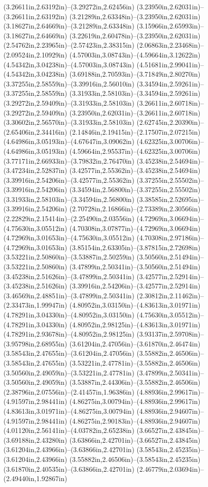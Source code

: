 (3.26611in,2.63192in)--(3.29272in,2.62456in) (3.23950in,2.62031in)--(3.26611in,2.63192in) (3.21289in,2.63348in)--(3.23950in,2.62031in) (3.18627in,2.64669in)--(3.21289in,2.63348in) (3.15966in,2.65993in)--(3.18627in,2.64669in) (3.22619in,2.60478in)--(3.23950in,2.62031in) (2.54762in,2.23965in)--(2.57423in,2.38315in) (2.06863in,2.23468in)--(2.09524in,2.10929in) (4.57003in,3.08743in)--(4.59664in,3.12622in) (4.54342in,3.04238in)--(4.57003in,3.08743in) (4.51681in,2.99041in)--(4.54342in,3.04238in) (3.69188in,2.70593in)--(3.71849in,2.80270in) (3.37255in,2.58559in)--(3.39916in,2.56010in) (3.34594in,2.59261in)--(3.37255in,2.58559in) (3.31933in,2.58103in)--(3.34594in,2.59261in) (3.29272in,2.59409in)--(3.31933in,2.58103in) (3.26611in,2.60718in)--(3.29272in,2.59409in) (3.23950in,2.62031in)--(3.26611in,2.60718in) (3.30602in,2.56570in)--(3.31933in,2.58103in) (2.62745in,2.20390in)--(2.65406in,2.34416in) (2.14846in,2.19415in)--(2.17507in,2.07215in) (4.64986in,3.05193in)--(4.67647in,3.09062in) (4.62325in,3.00706in)--(4.64986in,3.05193in) (4.59664in,2.95537in)--(4.62325in,3.00706in) (3.77171in,2.66933in)--(3.79832in,2.76470in) (3.45238in,2.54694in)--(3.47234in,2.52837in) (3.42577in,2.55362in)--(3.45238in,2.54694in) (3.39916in,2.54206in)--(3.42577in,2.55362in) (3.37255in,2.55502in)--(3.39916in,2.54206in) (3.34594in,2.56800in)--(3.37255in,2.55502in) (3.31933in,2.58103in)--(3.34594in,2.56800in) (3.38585in,2.52695in)--(3.39916in,2.54206in) (2.70728in,2.16866in)--(2.73389in,2.30566in) (2.22829in,2.15414in)--(2.25490in,2.03556in) (4.72969in,3.06694in)--(4.75630in,3.05512in) (4.70308in,3.07877in)--(4.72969in,3.06694in) (4.72969in,3.01653in)--(4.75630in,3.05512in) (4.70308in,2.97186in)--(4.72969in,3.01653in) (3.85154in,2.63305in)--(3.87815in,2.72698in) (3.53221in,2.50860in)--(3.53887in,2.50259in) (3.50560in,2.51494in)--(3.53221in,2.50860in) (3.47899in,2.50341in)--(3.50560in,2.51494in) (3.45238in,2.51626in)--(3.47899in,2.50341in) (3.42577in,2.52914in)--(3.45238in,2.51626in) (3.39916in,2.54206in)--(3.42577in,2.52914in) (3.46569in,2.48851in)--(3.47899in,2.50341in) (2.30812in,2.11462in)--(2.33473in,1.99947in) (4.80952in,3.03150in)--(4.83613in,3.01971in) (4.78291in,3.04330in)--(4.80952in,3.03150in) (4.75630in,3.05512in)--(4.78291in,3.04330in) (4.80952in,2.98125in)--(4.83613in,3.01971in) (4.78291in,2.93678in)--(4.80952in,2.98125in) (3.93137in,2.59708in)--(3.95798in,2.68955in) (3.61204in,2.47056in)--(3.61870in,2.46474in) (3.58543in,2.47655in)--(3.61204in,2.47056in) (3.55882in,2.46506in)--(3.58543in,2.47655in) (3.53221in,2.47781in)--(3.55882in,2.46506in) (3.50560in,2.49059in)--(3.53221in,2.47781in) (3.47899in,2.50341in)--(3.50560in,2.49059in) (3.53887in,2.44306in)--(3.55882in,2.46506in) (2.38796in,2.07556in)--(2.41457in,1.96386in) (4.88936in,2.99617in)--(4.91597in,2.98441in) (4.86275in,3.00794in)--(4.88936in,2.99617in) (4.83613in,3.01971in)--(4.86275in,3.00794in) (4.88936in,2.94607in)--(4.91597in,2.98441in) (4.86275in,2.90183in)--(4.88936in,2.94607in) (4.01120in,2.56141in)--(4.03782in,2.65238in) (3.66527in,2.43845in)--(3.69188in,2.43280in) (3.63866in,2.42701in)--(3.66527in,2.43845in) (3.61204in,2.43966in)--(3.63866in,2.42701in) (3.58543in,2.45235in)--(3.61204in,2.43966in) (3.55882in,2.46506in)--(3.58543in,2.45235in) (3.61870in,2.40535in)--(3.63866in,2.42701in) (2.46779in,2.03694in)--(2.49440in,1.92867in) 